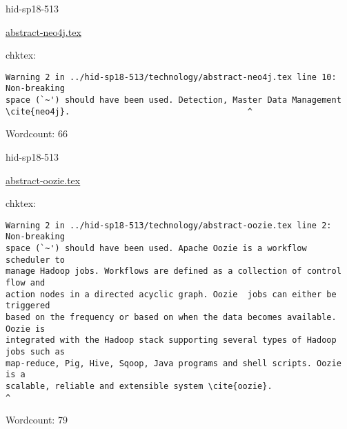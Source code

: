 

\begin{IU}

hid-sp18-513

\href{https://github.com/cloudmesh-community/hid-sp18-513/blob/master//technology/abstract-neo4j.tex}{abstract-neo4j.tex}

 
chktex:
\begin{tiny}
\begin{verbatim}
Warning 2 in ../hid-sp18-513/technology/abstract-neo4j.tex line 10: Non-breaking
space (`~') should have been used. Detection, Master Data Management
\cite{neo4j}.                                    ^
\end{verbatim}
\end{tiny}

Wordcount: 66

\end{IU}



\begin{IU}

hid-sp18-513

\href{https://github.com/cloudmesh-community/hid-sp18-513/blob/master//technology/abstract-oozie.tex}{abstract-oozie.tex}

 
chktex:
\begin{tiny}
\begin{verbatim}
Warning 2 in ../hid-sp18-513/technology/abstract-oozie.tex line 2: Non-breaking
space (`~') should have been used. Apache Oozie is a workflow scheduler to
manage Hadoop jobs. Workflows are defined as a collection of control flow and
action nodes in a directed acyclic graph. Oozie  jobs can either be triggered
based on the frequency or based on when the data becomes available. Oozie is
integrated with the Hadoop stack supporting several types of Hadoop jobs such as
map-reduce, Pig, Hive, Sqoop, Java programs and shell scripts. Oozie is a
scalable, reliable and extensible system \cite{oozie}.
^
\end{verbatim}
\end{tiny}

Wordcount: 79

\end{IU}



